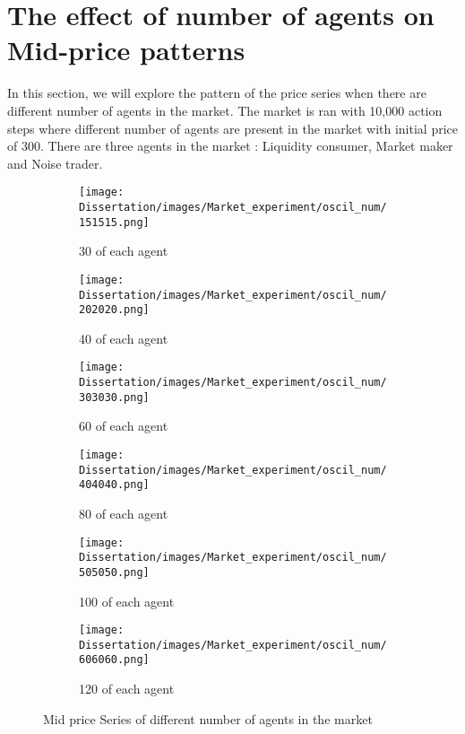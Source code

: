 \section{The effect of number of agents on Mid-price patterns}

In this section, we will explore the pattern of the price series when there are different number of agents in the market. The market is ran with 10,000 action steps where different number of agents are present in the market with initial price of 300. There are three agents in the market : Liquidity consumer, Market maker and Noise trader. 

\begin{figure}[h]
  \begin{subfigure}[b]{0.5\textwidth}
    \texttt{[image: Dissertation/images/Market\_experiment/oscil\_num/151515.png]}
    \caption{30 of each agent}
    \label{fig:O_experiment_30}
  \end{subfigure}
  \begin{subfigure}[b]{0.5\textwidth}
    \texttt{[image: Dissertation/images/Market\_experiment/oscil\_num/202020.png]}
    \caption{40 of each agent}
    \label{fig:O_experiment_40}
  \end{subfigure}

  \begin{subfigure}[b]{0.5\textwidth}
    \texttt{[image: Dissertation/images/Market\_experiment/oscil\_num/303030.png]}   \caption{60 of each agent}
    \label{fig:O_experiment_60}
  \end{subfigure}
  \begin{subfigure}[b]{0.5\textwidth}
    \texttt{[image: Dissertation/images/Market\_experiment/oscil\_num/404040.png]}
    \caption{80 of each agent}
    \label{fig:O_experiment_80}
  \end{subfigure}

  \begin{subfigure}[b]{0.5\textwidth}
    \texttt{[image: Dissertation/images/Market\_experiment/oscil\_num/505050.png]}
    \caption{100 of each agent}
    \label{fig:O_experiment_100}
  \end{subfigure}
  \begin{subfigure}[b]{0.5\textwidth}
    \texttt{[image: Dissertation/images/Market\_experiment/oscil\_num/606060.png]}
    \caption{120 of each agent}
    \label{fig:O_experiment_120}
  \end{subfigure}
\caption{Mid price Series of different number of agents in the market} 
\end{figure}
\FloatBarrier

